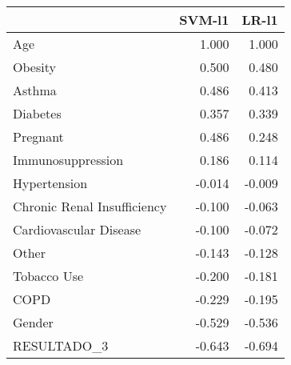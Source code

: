 \begin{tabular}{lrr}
\toprule
{} &  SVM-l1 &  LR-l1 \\
\midrule
Age                         &   1.000 &  1.000 \\
Obesity                     &   0.500 &  0.480 \\
Asthma                      &   0.486 &  0.413 \\
Diabetes                    &   0.357 &  0.339 \\
Pregnant                    &   0.486 &  0.248 \\
Immunosuppression           &   0.186 &  0.114 \\
Hypertension                &  -0.014 & -0.009 \\
Chronic Renal Insufficiency &  -0.100 & -0.063 \\
Cardiovascular Disease      &  -0.100 & -0.072 \\
Other                       &  -0.143 & -0.128 \\
Tobacco Use                 &  -0.200 & -0.181 \\
COPD                        &  -0.229 & -0.195 \\
Gender                      &  -0.529 & -0.536 \\
RESULTADO\_3                 &  -0.643 & -0.694 \\
\bottomrule
\end{tabular}
